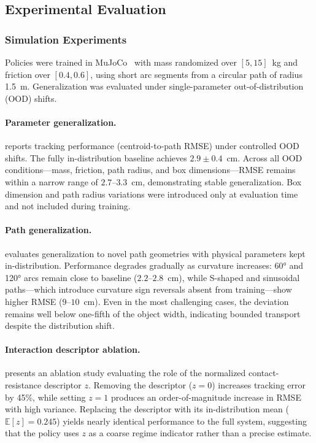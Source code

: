 \subsection{Experimental Evaluation}
\label{sec:pho_results}

\subsubsection{Simulation Experiments}

Policies were trained in MuJoCo~\citep{todorov2012mujoco} with mass randomized over $[5, 15]$~kg and friction over $[0.4, 0.6]$, using short arc segments from a circular path of radius 1.5~m. Generalization was evaluated under single-parameter out-of-distribution (OOD) shifts.

\paragraph{Parameter generalization.}  reports tracking performance (centroid-to-path RMSE) under controlled OOD shifts. The fully in-distribution baseline achieves $2.9 \pm 0.4$~cm. Across all OOD conditions---mass, friction, path radius, and box dimensions---RMSE remains within a narrow range of $2.7$--$3.3$~cm, demonstrating stable generalization. Box dimension and path radius variations were introduced only at evaluation time and not included during training.



\paragraph{Path generalization.}  evaluates generalization to novel path geometries with physical parameters kept in-distribution. Performance degrades gradually as curvature increases: 60° and 120° arcs remain close to baseline ($2.2$--$2.8$~cm), while S-shaped and sinusoidal paths---which introduce curvature sign reversals absent from training---show higher RMSE ($9$--$10$~cm). Even in the most challenging cases, the deviation remains well below one-fifth of the object width, indicating bounded transport despite the distribution shift.



\paragraph{Interaction descriptor ablation.}  presents an ablation study evaluating the role of the normalized contact-resistance descriptor $z$. Removing the descriptor ($z = 0$) increases tracking error by 45\%, while setting $z = 1$ produces an order-of-magnitude increase in RMSE with high variance. Replacing the descriptor with its in-distribution mean ($\mathbb{E}[z] = 0.245$) yields nearly identical performance to the full system, suggesting that the policy uses $z$ as a coarse regime indicator rather than a precise estimate.

